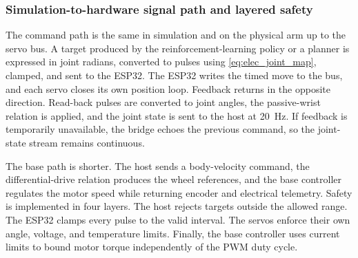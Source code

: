 \subsubsection{Simulation-to-hardware signal path and layered safety}
\label{sec:electrical_sim_to_real}

The command path is the same in simulation and on the physical arm up to the servo bus. A target produced by the reinforcement-learning policy or a planner is expressed in joint radians, converted to pulses using \eqref{eq:elec_joint_map}, clamped, and sent to the ESP32. The ESP32 writes the timed move to the bus, and each servo closes its own position loop. Feedback returns in the opposite direction. Read-back pulses are converted to joint angles, the passive-wrist relation is applied, and the joint state is sent to the host at 20~Hz. If feedback is temporarily unavailable, the bridge echoes the previous command, so the joint-state stream remains continuous.

The base path is shorter. The host sends a body-velocity command, the differential-drive relation produces the wheel references, and the base controller regulates the motor speed while returning encoder and electrical telemetry. Safety is implemented in four layers. The host rejects targets outside the allowed range. The ESP32 clamps every pulse to the valid interval. The servos enforce their own angle, voltage, and temperature limits. Finally, the base controller uses current limits to bound motor torque independently of the PWM duty cycle.

